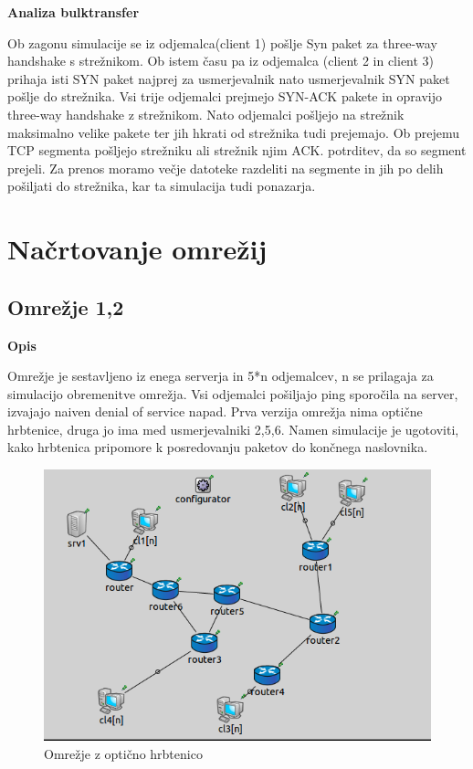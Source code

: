 \documentclass[11pt, a4paper, slovene]{book}
\begin{document}
\large\bf Analiza bulktransfer
\normalfont \normalsize

Ob zagonu simulacije se iz odjemalca(client 1) pošlje Syn paket za three-way handshake s strežnikom. Ob istem času pa iz odjemalca (client 2 in client 3) prihaja isti SYN paket najprej za usmerjevalnik nato usmerjevalnik SYN paket pošlje do strežnika. Vsi trije odjemalci prejmejo SYN-ACK pakete in opravijo three-way handshake z strežnikom. Nato odjemalci pošljejo na strežnik maksimalno velike pakete ter jih hkrati od strežnika tudi prejemajo. Ob prejemu TCP segmenta pošljejo strežniku ali strežnik njim ACK. potrditev, da so segment prejeli. Za prenos moramo večje datoteke razdeliti na segmente in jih po delih pošiljati do strežnika, kar ta simulacija tudi ponazarja.



\section{Načrtovanje omrežij}
\subsection{Omrežje 1,2}
\large \bf Opis 
\normalfont \normalsize

Omrežje je sestavljeno iz enega serverja in 5*n odjemalcev, n se prilagaja za simulacijo obremenitve omrežja. Vsi odjemalci pošiljajo ping sporočila na server, izvajajo naiven denial of service napad. Prva verzija omrežja nima optične hrbtenice, druga jo ima med usmerjevalniki 2,5,6. 
Namen simulacije je ugotoviti, kako hrbtenica pripomore k posredovanju paketov do končnega naslovnika.

\begin{figure}[h]
	\centering
	\includegraphics[width=\textwidth]{omrHrbet.png}
	\caption{Omrežje z optično hrbtenico}
	\label{opticnaHrbtenica}	
\end{figure}
\end{document}

